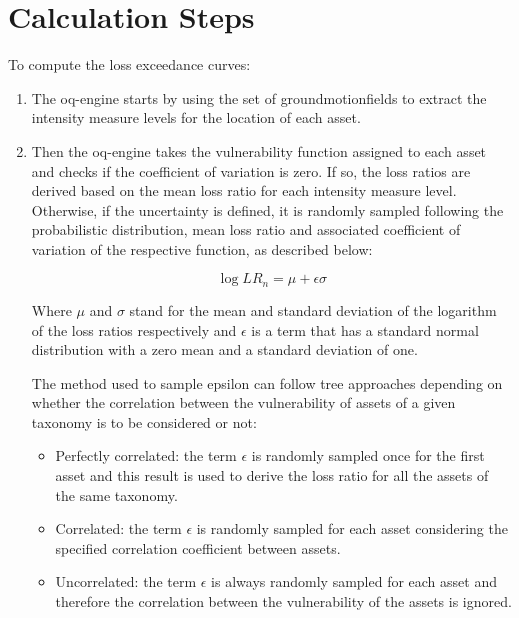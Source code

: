 \section{Calculation Steps}

To compute the loss exceedance curves:

\begin{enumerate}
\item The oq-engine starts by using the set of \glspl{groundmotionfield} to extract the intensity measure levels for the location of each \gls{asset}. 
 
\item Then the oq-engine takes the \gls{vulnerability function} assigned to each \gls{asset} and checks if the coefficient of variation is zero. If so, the loss ratios are derived based on the mean loss ratio for each intensity measure level. Otherwise, if the uncertainty is defined, it is randomly sampled following the probabilistic distribution, mean loss ratio and associated coefficient of variation of the respective function, as described below:

\begin{equation}
\log{LR_n} = \mu + \epsilon\sigma
\end{equation}

Where $\mu$ and $\sigma$ stand for the mean and standard deviation of the logarithm of the loss ratios respectively and $\epsilon$ is a term that has a standard normal distribution with a zero mean and a standard deviation of one.  

The method used to sample epsilon can follow tree approaches depending on whether the correlation between the vulnerability of \glspl{asset} of a given \gls{taxonomy} is to be considered or not:

\begin{itemize}

\item Perfectly correlated: the term $\epsilon$ is randomly sampled once for the first \gls{asset} and this result is used to derive the loss ratio for all the \glspl{asset} of the same \gls{taxonomy}. 

\item Correlated: the term $\epsilon$ is randomly sampled for each \gls{asset} considering the specified correlation coefficient between \glspl{asset}. 

\item Uncorrelated: the term $\epsilon$ is always randomly sampled for each \gls{asset} and therefore the correlation between the vulnerability of the \glspl{asset} is ignored.
\end{itemize}


\end{enumerate}
